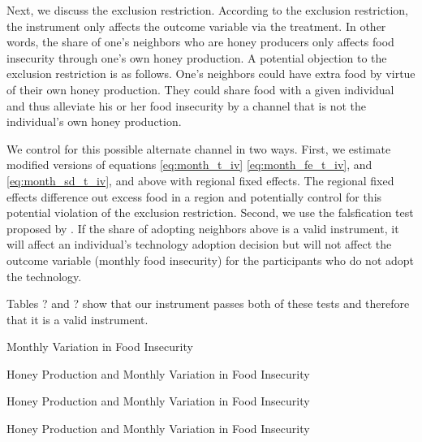 \documentclass[../main.tex]{subfiles}
\begin{document}
Next, we discuss the exclusion restriction. According to the exclusion
restriction, the instrument only affects the outcome variable via the treatment.
In other words, the share of one's neighbors who are honey producers
only affects food insecurity through one's own honey production. A potential
objection to the exclusion restriction is as follows. One's neighbors could
have extra food by virtue of their own honey production. They could share
food with a given individual and thus alleviate his or her food insecurity by
a channel that is not the individual's own honey production. 

We control
for this possible alternate channel in two ways. 
First, we estimate modified versions of equations
\eqref{eq:month_t_iv}
\eqref{eq:month_fe_t_iv}, and \eqref{eq:month_sd_t_iv}, and
above with regional fixed effects. The regional
fixed effects difference out excess food in a region and 
potentially control for
this potential violation of the exclusion restriction. Second,
we use the falsfication test proposed by \textcite{di_falco_does_2011}.
If the share of adopting neighbors above is a valid instrument, it will affect 
an individual's technology
adoption decision but will not affect the outcome variable
(monthly food insecurity) for the participants who do not adopt the technology. 

Tables ? and ? show that our instrument passes both of these
tests and therefore that it is a valid instrument.

\begin{table}[p]
    \centering
    \caption{Monthly Variation in Food Insecurity}
    
    \label{tab:table1}
\end{table}

\begin{landscape}
\begin{table}[p]
    \centering
    \caption{Honey Production and Monthly Variation in Food Insecurity}
    
    \label{tab:table2}
\end{table}
\end{landscape}

\begin{table}[p]
    \centering
    \caption{Honey Production and Monthly Variation in Food Insecurity}
    
    \label{tab:table3}
\end{table}


\begin{table}[p]
    \centering
    \caption{Honey Production and Monthly Variation in Food Insecurity}
    
    \label{tab:table4}
\end{table}
\end{document}
